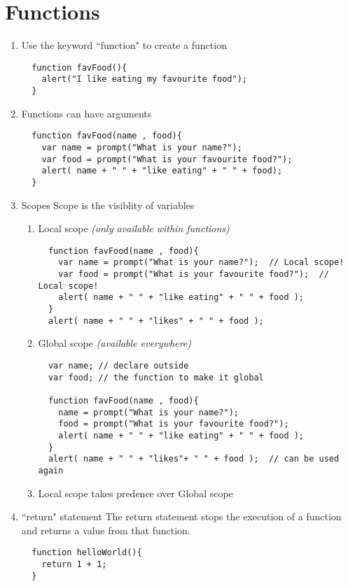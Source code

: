 \documentclass{article}
\begin{document}
\section{Functions}
\begin{enumerate}
\item Use the keyword ``function" to create a function
\begin{lstlisting}
  function favFood(){
    alert("I like eating my favourite food");
  }
\end{lstlisting}
\item Functions can have arguments
\begin{lstlisting}
  function favFood(name , food){
    var name = prompt("What is your name?");
    var food = prompt("What is your favourite food?");
    alert( name + " " + "like eating" + " " + food);
  }
\end{lstlisting}
\item Scopes
Scope is the visiblity of variables
\begin{enumerate}
\item Local scope \emph{(only available within functions)}
\begin{lstlisting}
  function favFood(name , food){
    var name = prompt("What is your name?");  // Local scope!
    var food = prompt("What is your favourite food?");  // Local scope!
    alert( name + " " + "like eating" + " " + food );
  }
  alert( name + " " + "likes" + " " + food );
\end{lstlisting}
\item Global scope \emph{(available everywhere)}
\begin{lstlisting}
  var name; // declare outside
  var food; // the function to make it global

  function favFood(name , food){
    name = prompt("What is your name?");
    food = prompt("What is your favourite food?");
    alert( name + " " + "like eating" + " " + food );
  }
  alert( name + " " + "likes"+ " " + food );  // can be used again
\end{lstlisting}
\item Local scope takes predence over Global scope
\end{enumerate}
\item ``return" statement
The return statement stops the execution of a function and returns a value from that function.
\begin{lstlisting}
  function helloWorld(){
    return 1 + 1;
  }
\end{lstlisting}
\end{enumerate}
\end{document}
